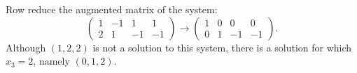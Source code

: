 \documentclass{ximera}
\begin{document}
\begin{exercise}
\begin{solution}
\soln Row reduce the augmented matrix of the system:
\[
\left(\begin{array}{rrr|r} 1 & -1 & 1 & 1 \\ 2 & 1 & -1 & -1\end{array}\right)
\longrightarrow
\left(\begin{array}{rrr|r} 1 & 0 & 0 & 0 \\ 0 & 1 & -1 & -1\end{array}\right).
\]
Although $(1,2,2)$ is not a solution to this system, there is a solution
for which $x_3 = 2$, namely $(0,1,2)$.

\end{solution}
\end{exercise}
\end{document}
